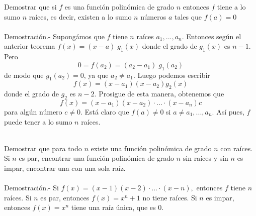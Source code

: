 \begin{teo}
Demostrar que si $f$ es una función polinómica de grado $n$ entonces $f$ tiene a lo sumo $n$ raíces, es decir, existen a lo sumo $n$ números $a$ tales que $f(a)=0$\\\\
Demostración.- \; Supongámos que $f$ tiene $n$ raíces $a_1,...,a_n$. Entonces según el anterior teorema $f(x) = (x-a)\; g_1(x)$ donde el grado de $g_1(x)$ es $n-1.$ Pero $$0=f(a_2) = (a_2 - a_1) \; g_1(a_2)$$
de modo que $g_1(a_2) = 0$, ya que $a_2 \neq a_1.$ Luego podemos escribir $$f(x)=(x-a_1)(x-a_2)g_2(x)$$ donde el grado de $g_2$ es $n-2.$ Prosigue de esta manera, obtenemos que $$f(x)=(x-a_1)(x-a_2) \cdot ... \cdot (x-a_n)c$$ para algún número $c\neq 0.$ Está claro que $f(a) \neq 0$ si $a\neq a_1,..., a_n.$ Así pues, $f$ puede tener a lo sumo $n$ raíces.\\\\
\end{teo}

\begin{teo}
Demostrar que para todo $n$ existe una función polinómica de grado $n$ con raíces. Si $n$ es par, encontrar una función polinómica de grado $n$ sin raíces y sin $n$ es impar, encontrar una con una sola raíz.\\\\
Demostración.- \; Si $f(x) = (x-1)(x-2) \cdot ... \cdot (x-n),$ entonces $f$ tiene $n$ raíces. Si $n$ es par, entonces $f(x) = x^n + 1$ no tiene raíces. Si $n$ es impar, entonces $f(x)=x^n$ tiene una raíz única, que es $0.$\\\\ 
\end{teo}



